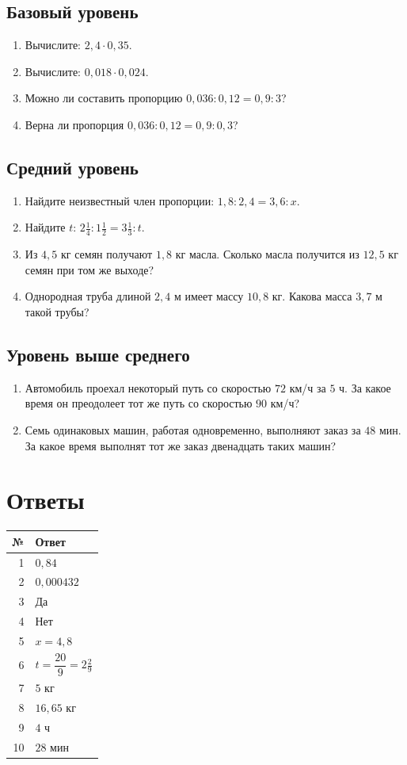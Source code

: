\documentclass[a4paper,12pt]{article}
\newcommand{\mix}[3]{#1\frac{#2}{#3}}
\begin{document}
\subsection*{Базовый уровень}
\begin{enumerate}
\item Вычислите: $2,4\cdot0,35$.
\item Вычислите: $0,018\cdot0,024$.
\item Можно ли составить пропорцию $0,036:0,12=0,9:3$?
\item Верна ли пропорция $0,036:0,12=0,9:0,3$?
\end{enumerate}
\subsection*{Средний уровень}
\begin{enumerate}[start=5]
\item Найдите неизвестный член пропорции: $1,8:2,4=3,6:x$.
\item Найдите $t$: $\mix{2}{1}{4}:\mix{1}{1}{2}=\mix{3}{1}{3}:t$.
\item Из $4,5$ кг семян получают $1,8$ кг масла. Сколько масла получится из $12,5$ кг семян при том же выходе?
\item Однородная труба длиной $2,4$ м имеет массу $10,8$ кг. Какова масса $3,7$ м такой трубы?
\end{enumerate}
\subsection*{Уровень выше среднего}
\begin{enumerate}[start=9]
\item Автомобиль проехал некоторый путь со скоростью $72$ км/ч за $5$ ч. За какое время он преодолеет тот же путь со скоростью $90$ км/ч?
\item Семь одинаковых машин, работая одновременно, выполняют заказ за $48$ мин. За какое время выполнят тот же заказ двенадцать таких машин?
\end{enumerate}

\clearpage
\section*{Ответы}
\begin{center}
\renewcommand{\arraystretch}{1.25}
\begin{tabularx}{\linewidth}{@{}rX@{}}
\toprule
№ & Ответ\\\midrule
1 & $0,84$\\
2 & $0,000432$\\
3 & Да\\
4 & Нет\\
5 & $x=4,8$\\
6 & $t=\dfrac{20}{9}=\mix{2}{2}{9}$\\
7 & $5$ кг\\
8 & $16,65$ кг\\
9 & $4$ ч\\
10 & $28$ мин\\
\bottomrule
\end{tabularx}
\end{center}
\end{document}
